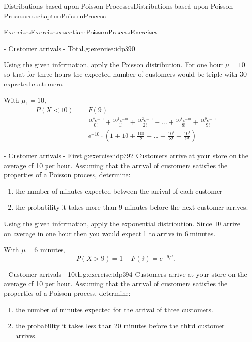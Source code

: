 \documentclass[oneside,10pt,]{book}
\numberwithin{equation}{section}
\newcommand{\lt}{<}
\newcommand{\gt}{>}
\begin{document}
\begin{chapterptx}{Distributions based upon Poisson Processes}{}{Distributions based upon Poisson Processes}{}{}{x:chapter:PoissonProcess}
\begin{sectionptx}{Exercises}{}{Exercises}{}{}{x:section:PoissonProcessExercises}
\begin{inlineexercise}{- Customer arrivals - Total.}{g:exercise:idp390}
%
\par\smallskip%
\noindent\hypertarget{g:solution:idp391}{}Using the given information, apply the Poisson distribution.  For one hour \(\mu = 10\) so that for three hours the expected number of customers would be triple with 30 expected customers.%
\par
With \(\mu_1 = 10\),%
\begin{align*}
P(X \lt 10) & = F(9)\\
& = \frac{10^0 e^{-10}}{0!} + \frac{10^1 e^{-10}}{1!} + \frac{10^2 e^{-10}}{2!} + ... + \frac{10^8 e^{-10}}{8!} + \frac{10^9 e^{-10}}{9!}\\
& = e^{-10} \cdot ( 1 + 10 + \frac{100}{2} + ... + \frac{10^8}{8!} + \frac{10^9}{9!} )
\end{align*}
%
\end{inlineexercise}%
\begin{inlineexercise}{- Customer arrivals - First.}{g:exercise:idp392}%
Customers arrive at your store on the average of 10 per hour.  Assuming that the arrival of customers satisfies the properties of a Poisson process, determine:%
\begin{enumerate}
\item{}the number of minutes expected between the arrival of each customer%
\item{}the probability it takes more than 9 minutes before the next customer arrives.%
\end{enumerate}
%
\par\smallskip%
\noindent\hypertarget{g:solution:idp393}{}Using the given information, apply the exponential distribution.  Since 10 arrive on average in one hour then you would expect 1 to arrive in 6 minutes.%
\par
With \(\mu = 6\) minutes,%
\begin{equation*}
P(X \gt 9) = 1 - F(9) = e^{-9/6}.
\end{equation*}
%
\end{inlineexercise}%
\begin{inlineexercise}{- Customer arrivals - 10th.}{g:exercise:idp394}%
Customers arrive at your store on the average of 10 per hour.  Assuming that the arrival of customers satisfies the properties of a Poisson process, determine:%
\begin{enumerate}
\item{}the number of minutes expected for the arrival of three customers.%
\item{}the probability it takes less than 20 minutes before the third customer arrives.%

\end{enumerate}
\end{inlineexercise}
\end{sectionptx}
\end{chapterptx}
\end{document}
